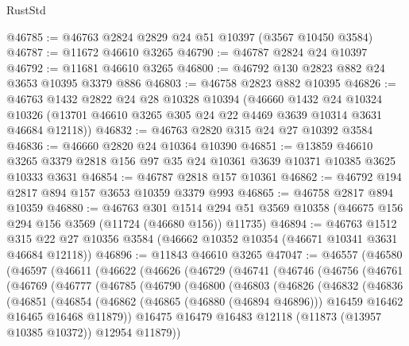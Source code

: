 \begin{lexlean}{RustStd}
\begin{coremodule}
@46785 := @46763 @2824 @2829 @24 @51 @10397 (@3567 @10450 @3584)
@46787 := @11672 @46610 @3265
@46790 := @46787 @2824 @24 @10397
@46792 := @11681 @46610 @3265
@46800 := @46792 @130 @2823 @882 @24 @3653 @10395 @3379 @886
@46803 := @46758 @2823 @882 @10395
@46826 := @46763
    @1432
    @2822
    @24
    @28
    @10328
    @10394
    (@46660
      @1432
      @24
      @10324
      @10326
      (@13701 @46610 @3265 @305 @24 @22 @4469 @3639 @10314 @3631 @46684 @12118))
@46832 := @46763 @2820 @315 @24 @27 @10392 @3584
@46836 := @46660 @2820 @24 @10364 @10390
@46851 := @13859
    @46610
    @3265
    @3379
    @2818
    @156
    @97
    @35
    @24
    @10361
    @3639
    @10371
    @10385
    @3625
    @10333
    @3631
@46854 := @46787 @2818 @157 @10361
@46862 := @46792 @194 @2817 @894 @157 @3653 @10359 @3379 @993
@46865 := @46758 @2817 @894 @10359
@46880 := @46763
    @301
    @1514
    @294
    @51
    @3569
    @10358
    (@46675 @156 @294 @156 @3569 (@11724 (@46680 @156)) @11735)
@46894 := @46763
    @1512
    @315
    @22
    @27
    @10356
    @3584
    (@46662 @10352 @10354 (@46671 @10341 @3631 @46684 @12118))
@46896 := @11843 @46610 @3265
@47047 := @46557
    (@46580
      (@46597
        (@46611
          (@46622
            (@46626
              (@46729
                (@46741
                  (@46746
                    (@46756
                      (@46761
                        (@46769
                          (@46777
                            (@46785
                              (@46790
                                (@46800
                                  (@46803
                                    (@46826
                                      (@46832
                                        (@46836
                                          (@46851
                                            (@46854
                                              (@46862
                                                (@46865 (@46880 (@46894 @46896)))
                                                @16459
                                                @16462
                                                @16465
                                                @16468
                                                @11879))
                                            @16475
                                            @16479
                                            @16483
                                            @12118
                                            (@11873 (@13957 @10385 @10372))
                                            @12954
                                            @11879))

\end{coremodule}
\end{lexlean}
